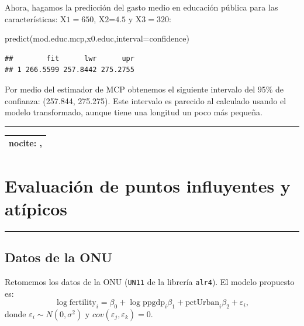 \documentclass[
]{article}
\newenvironment{Shaded}{\begin{snugshade}}{\end{snugshade}}
\newcommand{\AttributeTok}[1]{\textcolor[rgb]{0.77,0.63,0.00}{#1}}
\newcommand{\FunctionTok}[1]{\textcolor[rgb]{0.00,0.00,0.00}{#1}}
\newcommand{\NormalTok}[1]{#1}
\newcommand{\StringTok}[1]{\textcolor[rgb]{0.31,0.60,0.02}{#1}}
\begin{document}
Ahora, hagamos la predicción del gasto medio en educación pública para las características: \(\mbox{X1}=650\), \(\mbox{X2=4.5}\) y \(\mbox{X3}=320\):

\begin{Shaded}
\begin{Highlighting}[]
\FunctionTok{predict}\NormalTok{(mod.educ.mcp,x0.educ,}\AttributeTok{interval=}\StringTok{\textquotesingle{}confidence\textquotesingle{}}\NormalTok{)}
\end{Highlighting}
\end{Shaded}

\begin{verbatim}
##        fit      lwr      upr
## 1 266.5599 257.8442 275.2755
\end{verbatim}

Por medio del estimador de MCP obtenemos el siguiente intervalo del 95\% de confianza: (257.844, 275.275). Este intervalo es parecido al calculado usando el modelo transformado, aunque tiene una longitud un poco más pequeña.

\rule{\textwidth}{0.4pt}

\begin{longtable}[]{@{}l@{}}
\toprule
\endhead
nocite: \citet{montgomery_introduction_2012}, \citet{fox_applied_2016} \\
\bottomrule
\end{longtable}

\hypertarget{evaluaciuxf3n-de-puntos-influyentes-y-atuxedpicos}{%
\section{Evaluación de puntos influyentes y atípicos}\label{evaluaciuxf3n-de-puntos-influyentes-y-atuxedpicos}}

\rule{\textwidth}{0.4pt}

\hypertarget{datos-de-la-onu}{%
\subsection{Datos de la ONU}\label{datos-de-la-onu}}

Retomemos los datos de la ONU (\texttt{UN11} de la librería \texttt{alr4}). El modelo propuesto es:
\begin{equation}
\log \mbox{fertility}_{i} = \beta_{0} + \log \mbox{ppgdp}_{i}\beta_{1} + \mbox{pctUrban}_{i}\beta_{2} + \varepsilon_{i},
\label{eq:modUN}
\end{equation}
donde \(\varepsilon_{i}\sim N(0,\sigma^{2})\) y \(cov(\varepsilon_{j},\varepsilon_{k})=0\).
\end{document}
